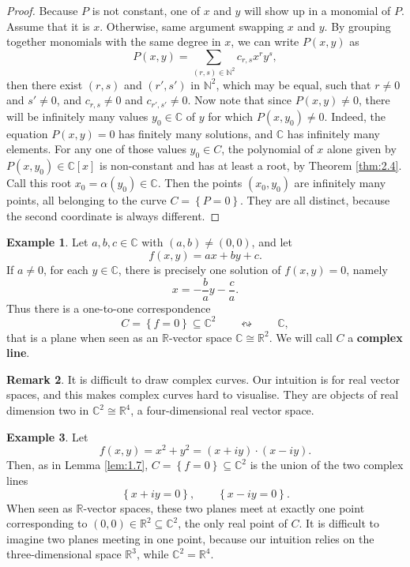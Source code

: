 \documentclass{article}
\newcommand{\N}{\mathbb{N}}
\newcommand{\R}{\mathbb{R}}
\newcommand{\C}{\mathbb{C}}
\newcommand{\rb}[1]{\left( #1 \right)}
\renewcommand{\sb}[1]{\left[ #1 \right]}
\newcommand{\cb}[1]{\left\{ #1 \right\}}
\theoremstyle{definition}\newtheorem{definition}{Definition}[section]
\theoremstyle{definition}\newtheorem{notation}[definition]{Notation}
\theoremstyle{definition}\newtheorem{remark}[definition]{Remark}
\theoremstyle{definition}\newtheorem{example1}[definition]{Example}
\theoremstyle{definition}\newtheorem{fact}{Fact}
\theoremstyle{definition}\newtheorem{exercise}{Exercise}
\theoremstyle{definition}\newtheorem*{example2}{Example}
\begin{document}
\begin{proof}
Because $ P $ is not constant, one of $ x $ and $ y $ will show up in a monomial of $ P $. Assume that it is $ x $. Otherwise, same argument swapping $ x $ and $ y $. By grouping together monomials with the same degree in $ x $, we can write $ P\rb{x, y} $ as
$$ P\rb{x, y} = \sum_{\rb{r, s} \in \N^2} c_{r, s}x^ry^s, $$
then there exist $ \rb{r, s} $ and $ \rb{r', s'} $ in $ \N^2 $, which may be equal, such that $ r \ne 0 $ and $ s' \ne 0 $, and $ c_{r, s} \ne 0 $ and $ c_{r', s'} \ne 0 $. Now note that since $ P\rb{x, y} \ne 0 $, there will be infinitely many values $ y_0 \in \C $ of $ y $ for which $ P\rb{x, y_0} \ne 0 $. Indeed, the equation $ P\rb{x, y} = 0 $ has finitely many solutions, and $ \C $ has infinitely many elements. For any one of those values $ y_0 \in C $, the polynomial of $ x $ alone given by $ P\rb{x, y_0} \in \C\sb{x} $ is non-constant and has at least a root, by Theorem \ref{thm:2.4}. Call this root $ x_0 = \alpha\rb{y_0} \in \C $. Then the points $ \rb{x_0, y_0} $ are infinitely many points, all belonging to the curve $ C = \cb{P = 0} $. They are all distinct, because the second coordinate is always different.
\end{proof}

\begin{example1}
Let $ a, b, c \in \C $ with $ \rb{a, b} \ne \rb{0, 0} $, and let
$$ f\rb{x, y} = ax + by + c. $$
If $ a \ne 0 $, for each $ y \in \C $, there is precisely one solution of $ f\rb{x, y} = 0 $, namely
$$ x = -\dfrac{b}{a}y - \dfrac{c}{a}. $$
Thus there is a one-to-one correspondence
$$ C = \cb{f = 0} \subseteq \C^2 \qquad \leftrightsquigarrow \qquad \C, $$
that is a plane when seen as an $ \R $-vector space $ \C \cong \R^2 $. We will call $ C $ a \textbf{complex line}.
\end{example1}

\begin{remark}
It is difficult to draw complex curves. Our intuition is for real vector spaces, and this makes complex curves hard to visualise. They are objects of real dimension two in $ \C^2 \cong \R^4 $, a four-dimensional real vector space.
\end{remark}

\begin{example1}
Let
$$ f\rb{x, y} = x^2 + y^2 = \rb{x + iy} \cdot \rb{x - iy}. $$
Then, as in Lemma \ref{lem:1.7}, $ C = \cb{f = 0} \subseteq \C^2 $ is the union of the two complex lines
$$ \cb{x + iy = 0}, \qquad \cb{x - iy = 0}. $$
When seen as $ \R $-vector spaces, these two planes meet at exactly one point corresponding to $ \rb{0, 0} \in \R^2 \subseteq \C^2 $, the only real point of $ C $. It is difficult to imagine two planes meeting in one point, because our intuition relies on the three-dimensional space $ \R^3 $, while $ \C^2 = \R^4 $.
\end{example1}
\end{document}
